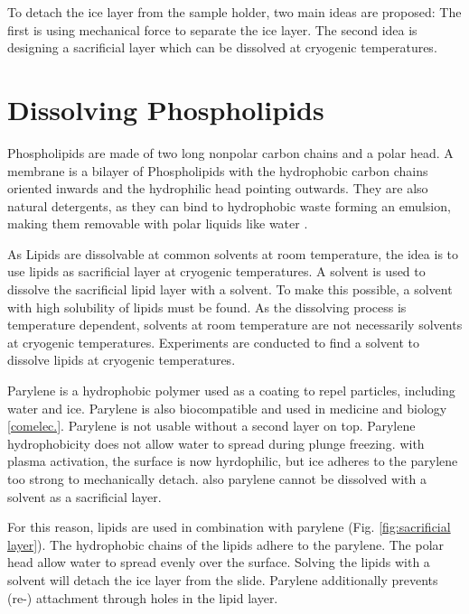 
To detach the ice layer from the sample holder, two main ideas are proposed: The first is using mechanical force to separate the ice layer. The second idea is designing a sacrificial layer which can be dissolved at cryogenic temperatures.

\section{Dissolving Phospholipids}

Phospholipids are made of two long nonpolar carbon chains and a polar head. A membrane is a bilayer of Phospholipids with the hydrophobic carbon chains oriented inwards and the hydrophilic head pointing outwards. They are also natural detergents, as they can bind to hydrophobic waste forming an emulsion, making them removable with polar liquids like water \cite{SriramaM.BhairiPh.D..2001}.

As Lipids are dissolvable at common solvents at room temperature, the idea is to use lipids as sacrificial layer at cryogenic temperatures. A solvent is used to dissolve the sacrificial lipid layer with a solvent. To make this possible, a solvent with high solubility of lipids must be found. As the dissolving process is temperature dependent, solvents at room temperature are not necessarily solvents at cryogenic temperatures. Experiments are conducted to find a solvent to dissolve lipids at cryogenic temperatures.


Parylene is a hydrophobic polymer used as a coating to repel particles, including water and ice. Parylene is also biocompatible and used in medicine and biology \ref{comelec.}. Parylene is not usable without a second layer on top. Parylene hydrophobicity does not allow water to spread during plunge freezing. with plasma activation, the surface is now hyrdophilic, but ice adheres to the parylene too strong to mechanically detach. also parylene cannot be dissolved with a solvent as a sacrificial layer.

For this reason, lipids are used in combination with parylene (Fig. \ref{fig:sacrificial layer}). The hydrophobic chains of the lipids adhere to the parylene. The polar head allow water to spread evenly over the surface. Solving the lipids with a solvent will detach the ice layer from the slide. Parylene additionally prevents (re-) attachment through holes in the lipid layer. 

